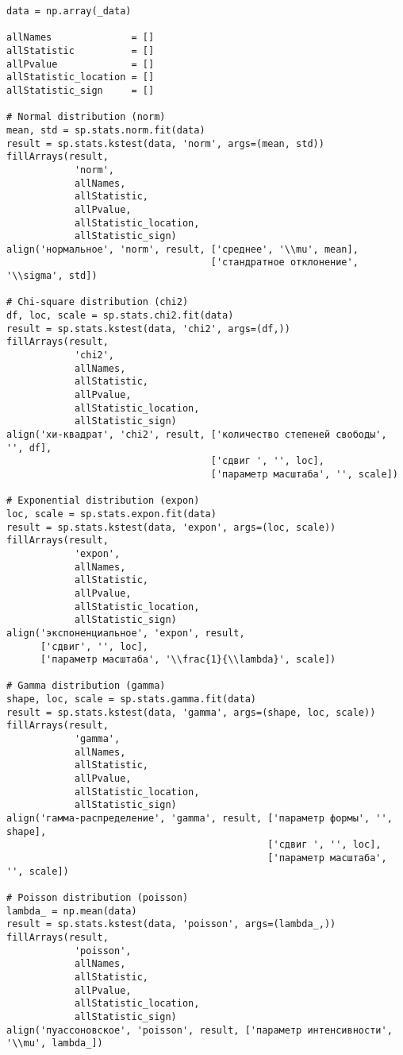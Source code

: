 \documentclass[a4paper, 14pt]{extarticle}
\begin{document}
\begin{lstlisting}
data = np.array(_data)

allNames              = []
allStatistic          = []
allPvalue             = []
allStatistic_location = []
allStatistic_sign     = []

# Normal distribution (norm)
mean, std = sp.stats.norm.fit(data)
result = sp.stats.kstest(data, 'norm', args=(mean, std))
fillArrays(result, 
            'norm', 
            allNames, 
            allStatistic, 
            allPvalue, 
            allStatistic_location, 
            allStatistic_sign)
align('нормальное', 'norm', result, ['среднее', '\\mu', mean], 
                                    ['стандратное отклонение', '\\sigma', std])

# Chi-square distribution (chi2)
df, loc, scale = sp.stats.chi2.fit(data)
result = sp.stats.kstest(data, 'chi2', args=(df,))
fillArrays(result, 
            'chi2', 
            allNames, 
            allStatistic, 
            allPvalue, 
            allStatistic_location, 
            allStatistic_sign)
align('хи-квадрат', 'chi2', result, ['количество степеней свободы', '', df], 
                                    ['сдвиг ', '', loc],
                                    ['параметр масштаба', '', scale])

# Exponential distribution (expon)
loc, scale = sp.stats.expon.fit(data)
result = sp.stats.kstest(data, 'expon', args=(loc, scale))
fillArrays(result, 
            'expon', 
            allNames, 
            allStatistic, 
            allPvalue, 
            allStatistic_location, 
            allStatistic_sign)
align('экспоненциальное', 'expon', result, 
      ['сдвиг', '', loc], 
      ['параметр масштаба', '\\frac{1}{\\lambda}', scale])

# Gamma distribution (gamma)
shape, loc, scale = sp.stats.gamma.fit(data)
result = sp.stats.kstest(data, 'gamma', args=(shape, loc, scale))
fillArrays(result, 
            'gamma', 
            allNames, 
            allStatistic, 
            allPvalue, 
            allStatistic_location, 
            allStatistic_sign)
align('гамма-распределение', 'gamma', result, ['параметр формы', '', shape], 
                                              ['сдвиг ', '', loc],
                                              ['параметр масштаба', '', scale])

# Poisson distribution (poisson)
lambda_ = np.mean(data)
result = sp.stats.kstest(data, 'poisson', args=(lambda_,))
fillArrays(result, 
            'poisson', 
            allNames, 
            allStatistic, 
            allPvalue, 
            allStatistic_location, 
            allStatistic_sign)
align('пуассоновское', 'poisson', result, ['параметр интенсивности', '\\mu', lambda_])


\end{lstlisting}
\end{document}
